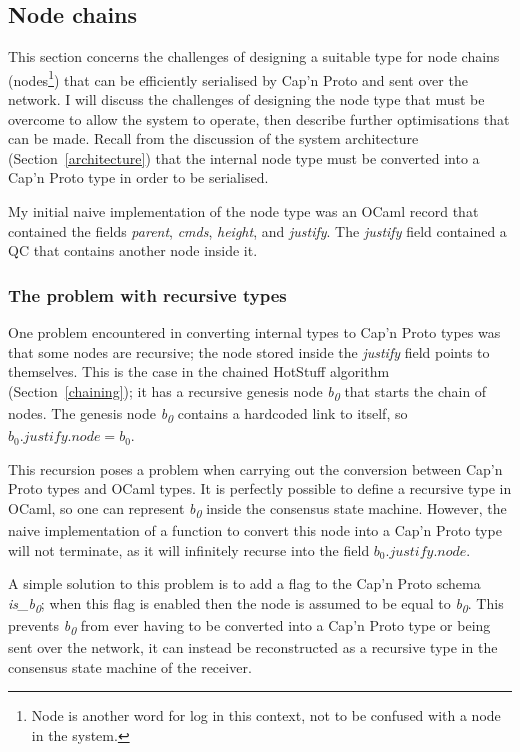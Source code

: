 \subsection{Node chains}
This section concerns the challenges of designing a suitable type for node chains (nodes\footnote{Node is another word for log in this context, not to be confused with a node in the system.}) that can be efficiently serialised by Cap'n Proto and sent over the network. I will discuss the challenges of designing the node type that must be overcome to allow the system to operate, then describe further optimisations that can be made. Recall from the discussion of the system architecture (Section~\ref{architecture}) that the internal node type must be converted into a Cap'n Proto type in order to be serialised.

My initial naive implementation of the node type was an OCaml record that contained the fields \textit{parent}, \textit{cmds}, \textit{height}, and \textit{justify}. The \textit{justify} field contained a QC that contains another node inside it.

\subsubsection{The problem with recursive types}
One problem encountered in converting internal types to Cap'n Proto types was that some nodes are recursive; the node stored inside the \textit{justify} field points to themselves. This is the case in the chained HotStuff algorithm (Section~\ref{chaining}); it has a recursive genesis node \textit{b\textsubscript{0}} that starts the chain of nodes. The genesis node \textit{b\textsubscript{0}} contains a hardcoded link to itself, so $ b_0.\textit{justify}.\textit{node} = b_0$.

This recursion poses a problem when carrying out the conversion between Cap'n Proto types and OCaml types. It is perfectly possible to define a recursive type in OCaml, so one can represent \textit{b\textsubscript{0}} inside the consensus state machine. However, the naive implementation of a function to convert this node into a Cap'n Proto type will not terminate, as it will infinitely recurse into the field $ b_0.\textit{justify}.\textit{node} $.

A simple solution to this problem is to add a flag to the Cap'n Proto schema \textit{is\_b\textsubscript{0}}; when this flag is enabled then the node is assumed to be equal to \textit{b\textsubscript{0}}. This prevents \textit{b\textsubscript{0}} from ever having to be converted into a Cap'n Proto type or being sent over the network, it can instead be reconstructed as a recursive type in the consensus state machine of the receiver.

